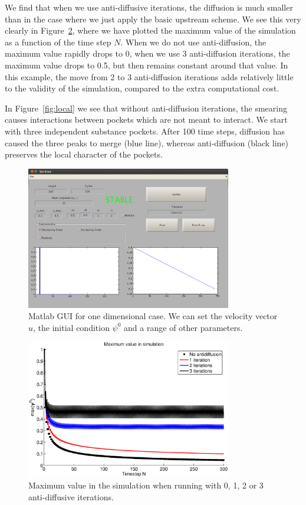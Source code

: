 \documentclass[10pt, a4paper]{article}
\begin{document}
We find that when we use anti-diffusive iterations, the diffusion is much smaller than in the case where we just apply the basic upstream scheme. We see this very clearly in Figure~\ref{fig:maxs}, where we have plotted the maximum value of the simulation as a function of the time step $N$. When we do not use anti-diffusion, the maximum value rapidly drops to 0, when we use 3 anti-diffusion iterations, the maximum value drops to 0.5, but then remains constant around that value. In this example, the move from 2 to 3 anti-diffusion iterations adds relatively little to the validity of the simulation, compared to the extra computational cost.

In Figure~\ref{fig:local} we see that without anti-diffusion iterations, the smearing causes interactions between pockets which are not meant to interact. We start with three independent substance pockets. After 100 time steps, diffusion has caused the three peaks to merge (blue line), whereas anti-diffusion (black line) preserves the local character of the pockets.



\begin{figure}[htp]
\centering
 \includegraphics[width=0.8\textwidth]{1dscreenshot.png}
 \caption{Matlab GUI for one dimensional case. We can set the velocity vector $u$, the initial condition $\psi^0$ and a range of other parameters.}
 \label{fig:1dgui}
\end{figure}

\begin{figure}[htp]
\centering
 \includegraphics[width=0.8\textwidth]{maxs}
 \caption{Maximum value in the simulation when running with 0, 1, 2 or 3 anti-diffusive iterations.}
 \label{fig:maxs}
\end{figure}
\end{document}
